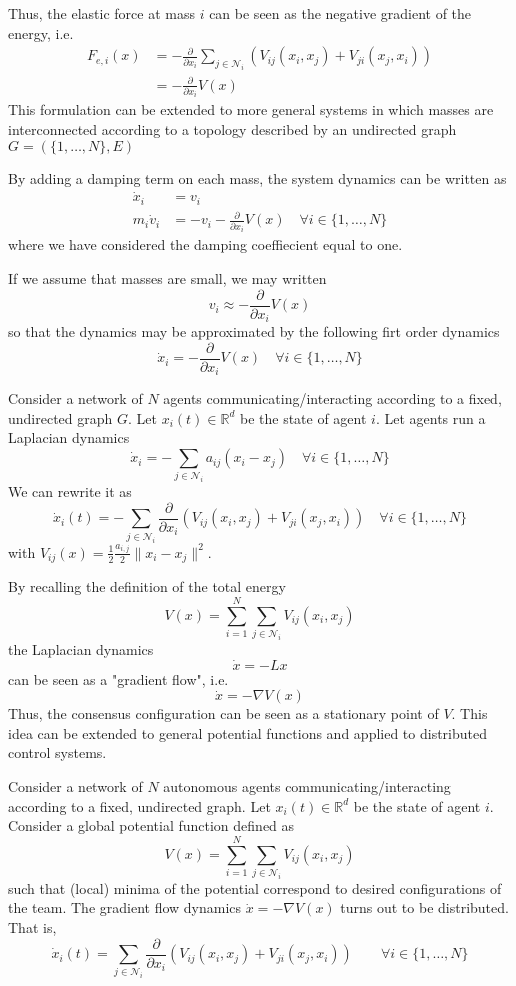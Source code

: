 \documentclass{book}
\newcommand{\R}{\mathbb{R}}
\theoremstyle{theoremv2}
\theoremstyle{defv2}
\theoremstyle{remark}
\theoremstyle{remark}
\theoremstyle{definition}
\theoremstyle{definition}
\begin{document}
Thus, the elastic force at mass $i$ can be seen as the negative gradient of the energy, i.e. 
\begin{align*}
    F_{e,i}(x) &= -\displaystyle\frac{\partial}{\partial x_i}\displaystyle\sum_{j\in\mathcal{N}_i}\left(V_{ij}(x_i,x_j)+V_{ji}(x_j,x_i)\right)\\
               &=-\displaystyle\frac{\partial}{\partial x_i} V(x) 
\end{align*}
This formulation can be extended to more general systems in which masses are interconnected according to a topology described by an undirected graph $G=(\{1,\dots,N\},E)$

By adding a damping term on each mass, the system dynamics can be written as 
\begin{align*}
    \dot{x}_i &= v_i\\
    m_i\dot{v}_i &= -v_i - \displaystyle\frac{\partial}{\partial x_i}V(x) \quad \forall i \in \{ 1,\dots,N \}
\end{align*}
where we have considered the damping coeffiecient equal to one. 

If we assume that masses are small, we may written
\[
    v_i \approx - \displaystyle\frac{\partial}{\partial x_i} V(x)
\]
so that the dynamics may be approximated by the following firt order dynamics
\[
    \dot{x}_i = - \displaystyle\frac{\partial}{\partial x_i}V(x) \quad \forall i\in\{ 1,\dots,N \}
\]

Consider a network of $N$ agents communicating/interacting according to a fixed, undirected graph $G$. Let $x_i(t)\in\R^d$ be the state of agent $i$. Let agents run a Laplacian dynamics
\[
    \dot{x}_i = - \displaystyle\sum_{j\in\mathcal{N}_i}a_{ij}(x_i-x_j) \quad \forall i\in\{ 1,\dots,N \}
\]
We can rewrite it as 
\[
    \dot{x}_i(t) = - \displaystyle\sum_{j\in \mathcal{N}_i} \displaystyle\frac{\partial}{\partial x_i}\left(V_{ij}(x_i,x_j)+V_{ji}(x_j,x_i)\right) \quad \forall i \in \{ 1,\dots,N \}
\]
with $V_{ij}(x) = \displaystyle\frac{1}{2}\displaystyle\frac{a_{i,j}}{2}\|x_i-x_j\|^2$.

By recalling the definition of the total energy
\[
    V(x)=\displaystyle\sum_{i=1}^{N}\displaystyle\sum_{j\in\mathcal{N}_i}V_{ij}(x_i,x_j)
\]
the Laplacian dynamics 
\[
    \dot{x} = -Lx
\]
can be seen as a "gradient flow", i.e. 
\[
    \dot{x} = -\nabla V(x)
\]
Thus, the consensus configuration can be seen as a stationary point of $V$. This idea can be extended to general potential functions and applied to distributed control systems.

Consider a network of $N$ autonomous agents communicating/interacting according to a fixed, undirected graph. Let $x_i(t)\in\R^d$ be the state of agent $i$. Consider a global potential function defined as 
\[
    V(x)=\displaystyle\sum_{i=1}^{N}\displaystyle\sum_{j\in\mathcal{N}_i}V_{ij}(x_i,x_j)
\]
such that (local) minima of the potential correspond to desired configurations of the team. The gradient flow dynamics $\dot{x} = -\nabla V(x)$ turns out to be distributed. That is,
 \[
     \dot{x}_i(t) = \displaystyle\sum_{j\in\mathcal{N}_i}\displaystyle\frac{\partial}{\partial x_i}\left(V_{ij}(x_i,x_j)+V_{ji}(x_j,x_i)\right) \qquad \forall i \in \{ 1,\dots,N \}
 \]
\end{document}
